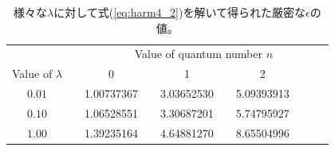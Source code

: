 \documentclass[11pt,pra,aps]{revtex4}
\begin{document}
\clearpage

\begin{longtable}[!h]{cccccccccc}
  \caption{\label{tab:exact} 様々な$\lambda$に対して式(\ref{eq:harm4_2})を解いて得られた厳密な$\epsilon$の値。}\\
  \hline
  \hline
  {}    && \multicolumn{8}{c}{Value of quantum number $n$} \\
  \cline{3-10}
  Value of $\lambda$    && 0 && 1 && 2 \\
  \hline
  $0.01$ && 1.00737367 && 3.03652530 && 5.09393913 \\
  $0.10$ && 1.06528551 && 3.30687201 && 5.74795927 \\
  $1.00$ && 1.39235164 && 4.64881270 && 8.65504996 \\
  \hline
  \hline        
\end{longtable}


%
%
%    
%
\end{document}
